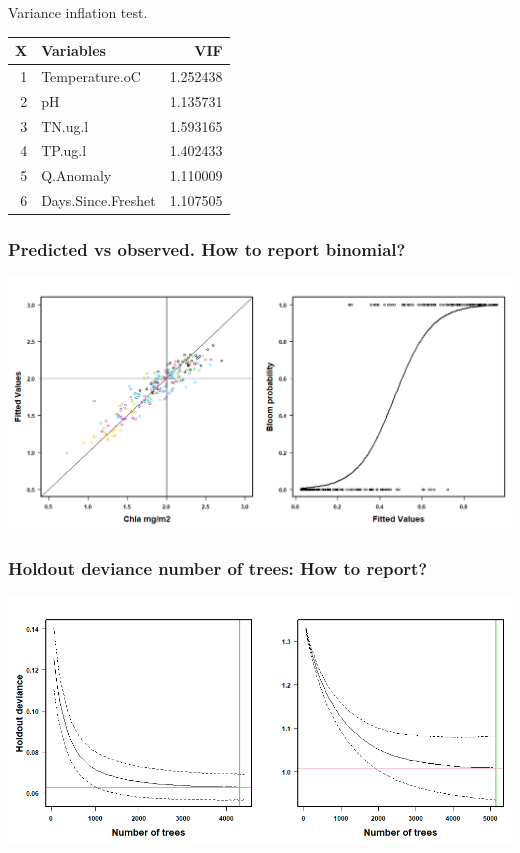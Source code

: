 \documentclass[
]{article}
\let\origfigure\figure
\let\endorigfigure\endfigure
\renewenvironment{figure}[1][2] {
    \expandafter\origfigure\expandafter[H]
} {
    \endorigfigure
}
\begin{document}
Variance inflation test.

\begin{longtable}[]{@{}rlr@{}}
\toprule()
X & Variables & VIF \\
\midrule()
\endhead
1 & Temperature.oC & 1.252438 \\
2 & pH & 1.135731 \\
3 & TN.ug.l & 1.593165 \\
4 & TP.ug.l & 1.402433 \\
5 & Q.Anomaly & 1.110009 \\
6 & Days.Since.Freshet & 1.107505 \\
\bottomrule()
\end{longtable}

\hypertarget{predicted-vs-observed.-how-to-report-binomial}{%
\subsubsection{Predicted vs observed. How to report
binomial?}\label{predicted-vs-observed.-how-to-report-binomial}}

\begin{figure}
\includegraphics[width=1\linewidth]{Manuscript_files/FIGURES/Predobs} \caption{A caption}\label{fig:unnamed-chunk-2}
\end{figure}

\hypertarget{holdout-deviance-number-of-trees-how-to-report}{%
\subsubsection{Holdout deviance number of trees: How to
report?}\label{holdout-deviance-number-of-trees-how-to-report}}

\begin{figure}
\includegraphics[width=1\linewidth]{Manuscript_files/FIGURES/Holdout_Dev} \caption{A caption}\label{fig:unnamed-chunk-3}
\end{figure}
\end{document}
